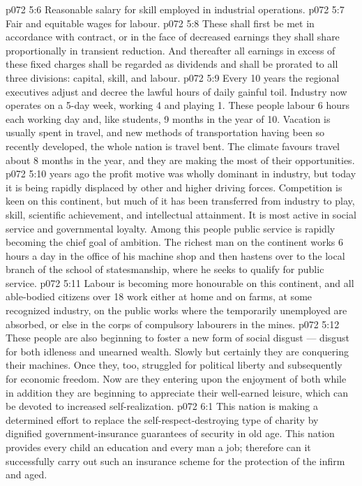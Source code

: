 \vs p072 5:6 \bibnobreakspace Reasonable salary for skill employed in industrial operations.
\vs p072 5:7 \bibnobreakspace Fair and equitable wages for labour.
\vs p072 5:8 \pc These shall first be met in accordance with contract, or in the face of decreased earnings they shall share proportionally in transient reduction. And thereafter all earnings in excess of these fixed charges shall be regarded as dividends and shall be prorated to all three divisions: capital, skill, and labour.
\vs p072 5:9 \pc Every 10 years the regional executives adjust and decree the lawful hours of daily gainful toil. Industry now operates on a 5\hyp{}day week, working 4 and playing 1. These people labour 6 hours each working day and, like students, 9 months in the year of 10. Vacation is usually spent in travel, and new methods of transportation having been so recently developed, the whole nation is travel bent. The climate favours travel about 8 months in the year, and they are making the most of their opportunities.
\vs p072 5:10  years ago the profit motive was wholly dominant in industry, but today it is being rapidly displaced by other and higher driving forces. Competition is keen on this continent, but much of it has been transferred from industry to play, skill, scientific achievement, and intellectual attainment. It is most active in social service and governmental loyalty. Among this people public service is rapidly becoming the chief goal of ambition. The richest man on the continent works 6 hours a day in the office of his machine shop and then hastens over to the local branch of the school of statesmanship, where he seeks to qualify for public service.
\vs p072 5:11 Labour is becoming more honourable on this continent, and all able\hyp{}bodied citizens over 18 work either at home and on farms, at some recognized industry, on the public works where the temporarily unemployed are absorbed, or else in the corps of compulsory labourers in the mines.
\vs p072 5:12 These people are also beginning to foster a new form of social disgust --- disgust for both idleness and unearned wealth. Slowly but certainly they are conquering their machines. Once they, too, struggled for political liberty and subsequently for economic freedom. Now are they entering upon the enjoyment of both while in addition they are beginning to appreciate their well\hyp{}earned leisure, which can be devoted to increased self\hyp{}realization.
\vs p072 6:1 This nation is making a determined effort to replace the self\hyp{}respect\hyp{}destroying type of charity by dignified government\hyp{}insurance guarantees of security in old age. This nation provides every child an education and every man a job; therefore can it successfully carry out such an insurance scheme for the protection of the infirm and aged.

